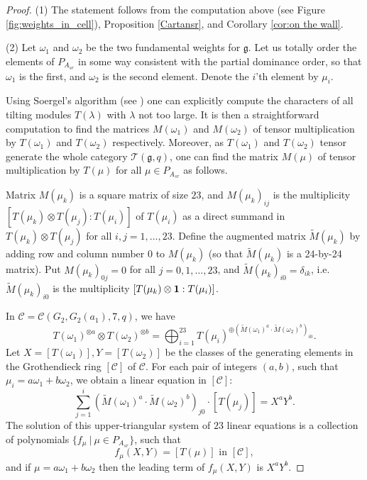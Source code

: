 \documentclass{amsart}
\theoremstyle{definition}
\newcommand{\C}{\mathcal{C}}
\newcommand{\be}{{\bf 1}}
\numberwithin{equation}{section}
\begin{document}
\begin{proof}
(1) The statement follows from the computation above (see Figure \ref{fig:weights_in_cell}), Proposition \ref{Cartansr}, and Corollary \ref{cor:on the  wall}.

(2) Let $\omega_1$ and $\omega_2$ be the two fundamental weights for $\mathfrak g$. Let us totally order the elements of $P_{A_{sr}}$ in some way consistent with the partial dominance order, so that $\omega_1$ is the first, and $\omega_2$ is the second element. Denote the $i$'th element by $\mu_i$.
        
        Using Soergel's algorithm (see \cite{So2}) one can explicitly compute the characters of all tilting modules $T(\lambda)$ with $\lambda$ not too large. It is then a straightforward computation to find the matrices $M(\omega_1)$ and $M(\omega_2)$ of tensor multiplication by $T(\omega_1)$ and $T(\omega_2)$ respectively. Moreover, as $T(\omega_1)$ and $T(\omega_2)$ tensor generate the whole category $\mathcal T(\mathfrak g, q)$, one can find the matrix $M(\mu)$ of tensor multiplication by $T(\mu)$ for all $\mu\in P_{A_{sr}}$ as follows.

         Matrix $M(\mu_k)$ is a square matrix of size $23$, and $M(\mu_k)_{ij}$ is the multiplicity $[T(\mu_k)\otimes T(\mu_j):T(\mu_i)]$ of $T(\mu_i)$ as a direct summand in $T(\mu_k)\otimes T(\mu_j)$ for all $i,j=1,\ldots, 23$. Define the augmented matrix $\widetilde M(\mu_k)$ by adding row and column number $0$ to $M(\mu_k)$ (so that $\widetilde M(\mu_k)$ is a 24-by-24 matrix). Put $M(\mu_k)_{0j}=0$ for all $j=0,1,\ldots, 23$, and $\widetilde M(\mu_k)_{i0} =\delta_{ik}$, i.e. $\widetilde M(\mu_k)_{i0}$ is the multiplicity  $[T(\mu_k)\otimes \be: T(\mu_i)]$. 

         In $\C=\C(G_2, G_2(a_1),7, q)$, we have 
         $$ T(\omega_1)^{\otimes a}\otimes T(\omega_2)^{\otimes b} = \bigoplus_{i=1}^{23}
           T(\mu_i)^{\oplus (\widetilde M(\omega_1)^a \cdot \widetilde M(\omega_2)^b)_{i0}}.
         $$
         Let $X=[T(\omega_1)], Y=[T(\omega_2)]$ be  the classes of the generating elements in the Grothendieck ring $[\C]$ of $\C$. For each pair of integers $(a,b)$, such that $\mu_i=a\omega_1+b\omega_2$, we obtain a linear equation in $[\C]$:
         $$
         \sum_{j=1}^{i} (\widetilde M(\omega_1)^a \cdot \widetilde M(\omega_2)^b)_{j0}\cdot [T(\mu_j)] = X^aY^b.
         $$
         The solution of this upper-triangular system of $23$ linear equations is a collection of polynomials $\{f_\mu~|~\mu\in P_{A_{sr}}\}$, such that
         $$
         f_\mu(X,Y) = [T(\mu)] \text{ in } [\C],
         $$
         and if $\mu=a\omega_1+b\omega_2$ then the leading term of $f_\mu(X,Y)$ is $X^aY^b$.


\end{proof}
\end{document}
